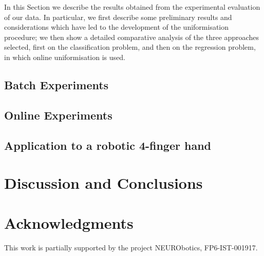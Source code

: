 \documentclass[twocolumn,referee]{svjour2}
\begin{document}
In this Section we describe the results obtained from the experimental
evaluation of our data. In particular, we first describe some
preliminary results and considerations which have led to the
development of the uniformisation procedure; we then show a detailed
comparative analysis of the three approaches selected, first on the
classification problem, and then on the regression problem, in which
online uniformisation is used.

\subsection{Batch Experiments}
\label{subsec:strategy}


\subsection{Online Experiments}
\label{subsec:online}


\subsection{Application to a robotic 4-finger hand}
\label{subsec:application}



\section{Discussion and Conclusions}
\label{sec:discussion}


\section*{Acknowledgments}

This work is partially supported by the project NEURObotics,
FP6-IST-001917.

{\small


}


\end{document}
